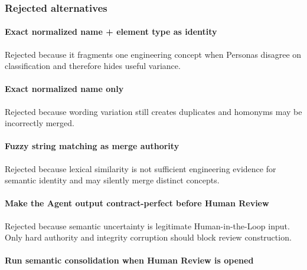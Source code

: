 \hypertarget{rejected-alternatives-4}{%
\subsubsection{Rejected alternatives}\label{rejected-alternatives-4}}

\hypertarget{exact-normalized-name--element-type-as-identity}{%
\paragraph{Exact normalized name + element type as identity}\label{exact-normalized-name--element-type-as-identity}}

Rejected because it fragments one engineering concept when Personas disagree on classification and therefore hides useful variance.

\hypertarget{exact-normalized-name-only}{%
\paragraph{Exact normalized name only}\label{exact-normalized-name-only}}

Rejected because wording variation still creates duplicates and homonyms may be incorrectly merged.

\hypertarget{fuzzy-string-matching-as-merge-authority}{%
\paragraph{Fuzzy string matching as merge authority}\label{fuzzy-string-matching-as-merge-authority}}

Rejected because lexical similarity is not sufficient engineering evidence for semantic identity and may silently merge distinct concepts.

\hypertarget{make-the-agent-output-contract-perfect-before-human-review}{%
\paragraph{Make the Agent output contract-perfect before Human Review}\label{make-the-agent-output-contract-perfect-before-human-review}}

Rejected because semantic uncertainty is legitimate Human-in-the-Loop input. Only hard authority and integrity corruption should block review construction.

\hypertarget{run-semantic-consolidation-when-human-review-is-opened}{%
\paragraph{Run semantic consolidation when Human Review is opened}\label{run-semantic-consolidation-when-human-review-is-opened}}

